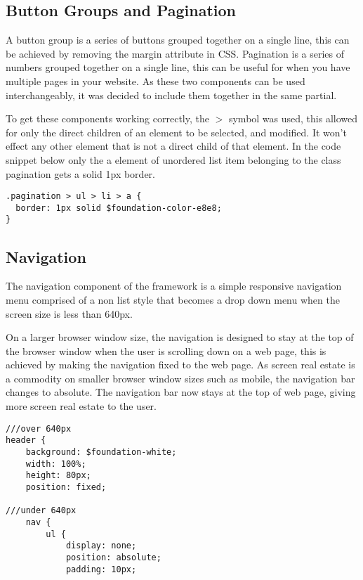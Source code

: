 \subsection*{Button Groups and Pagination}
A button group is a series of buttons grouped together on a single line, this can be achieved by removing the margin attribute in CSS. Pagination is a series of numbers grouped together on a single line, this can be useful for when you have multiple pages in your website. As these two components can be used interchangeably, it was decided to include them together in the same partial.

To get these components working correctly, the $>$ symbol was used, this allowed for only the direct children of an element to be selected, and modified. It won't effect any other element that is not a direct child of that element. In the code snippet below only the a element of unordered list item belonging to the class pagination gets a solid 1px border.   

\begin{lstlisting}[language=CSS3]
.pagination > ul > li > a {
  border: 1px solid $foundation-color-e8e8;
}
\end{lstlisting}

\newpage
\subsection*{Navigation}
The navigation component of the framework is a simple responsive navigation menu  comprised of a non list style that becomes a drop down menu when the screen size is less than 640px.

On a larger browser window size, the navigation is designed to stay at the top of the browser window when the user is scrolling down on a web page, this is achieved by making the navigation fixed to the web page. As screen real estate is a commodity on smaller browser window sizes such as mobile, the navigation bar changes to absolute. The navigation bar now stays at the top of web page, giving more screen real estate to the user. 

\begin{lstlisting}[language=CSS3]
///over 640px
header {
	background: $foundation-white;
	width: 100%;
	height: 80px;
	position: fixed; 
	
///under 640px			
	nav {
		ul {
			display: none;
			position: absolute;
			padding: 10px;
\end{lstlisting}

